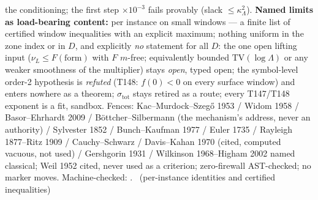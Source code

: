 the conditioning; the first step $\times10^{-3}$ fails provably (slack
$\le\kappa_\Lambda^2$).
\textbf{Named limits as load-bearing content:} per instance on small windows
--- a finite list of certified window inequalities with an explicit maximum;
nothing uniform in the zone index or in $D$, and explicitly \emph{no}
statement for all $D$: the one open lifting input ($\nu_L\le
F(\text{form})$ with $F$ $m$-free; equivalently bounded
$\mathrm{TV}(\log\Lambda)$ or any weaker smoothness of the multiplier)
stays \emph{open}, typed open; the symbol-level order-2 hypothesis is
\emph{refuted} (T148: $f(0)<0$ on every surface window) and enters nowhere
as a theorem; $\sigma_{\mathrm{tot}}$ stays retired as a route; every
T147/T148 exponent is a fit, sandbox. Fences: Kac--Murdock--Szeg\H{o} 1953 /
Widom 1958 / Basor--Ehrhardt 2009 / B\"ottcher--Silbermann (the mechanism's
address, never an authority) / Sylvester 1852 / Bunch--Kaufman 1977 / Euler
1735 / Rayleigh 1877--Ritz 1909 / Cauchy--Schwarz / Davis--Kahan 1970
(cited, computed vacuous, not used) / Gershgorin 1931 / Wilkinson
1968--Higham 2002 named classical; Weil 1952 cited, never used as a
criterion; zero-firewall AST-checked; no marker moves.
Machine-checked: .
\mE\ (per-instance identities and certified inequalities)


